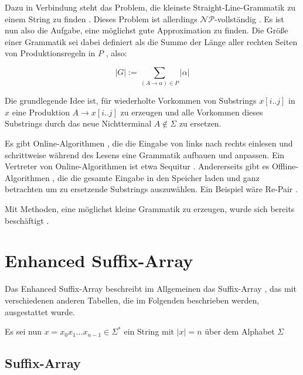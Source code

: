 Dazu in Verbindung steht das Problem, die kleinste Straight-Line-Grammatik zu einem String zu finden \cite{charikar_smallest_2005}. 
Dieses Problem ist allerdings $\mathcal{NP}$-vollständig \cite{charikar_smallest_2005}. Es ist nun also die Aufgabe, eine möglichst gute Approximation zu finden.
Die Größe einer Grammatik sei dabei definiert als die Summe der Länge aller rechten Seiten von Produktionsregeln in $P$ \cite{charikar_smallest_2005}, also:

\begin{equation*}
	|G| := \sum_{(A \rightarrow \alpha) \in P} |\alpha|
\end{equation*}

Die grundlegende Idee ist, für wiederholte Vorkommen von Substrings $x[i..j]$ in $x$ eine Produktion $A \rightarrow x[i..j]$ zu erzeugen und alle Vorkommen dieses Substrings durch das neue Nichtterminal $A \notin \Sigma$ zu ersetzen.

Es gibt Online-Algorithmen \cite{dinklage_compression_2017}, die die Eingabe von links nach rechts einlesen und schrittweise während des Lesens eine Grammatik aufbauen und anpassen. Ein Vertreter von Online-Algorithmen ist etwa Sequitur \cite{nevill-manning_identifying_1997}. 
Andererseits gibt es Offline-Algorithmen \cite{dinklage_compression_2017}, die die gesamte Eingabe in den Speicher laden und ganz betrachten um zu ersetzende Substrings auszuwählen. Ein Beispiel wäre Re-Pair \cite{larsson_offline_1999}.

Mit Methoden, eine möglichst kleine Grammatik zu erzeugen, wurde sich bereits beschäftigt \cite{benz_effective_2013, carrascosa_choosing_2010, charikar_smallest_2005}. 

\section{Enhanced Suffix-Array}

Das Enhanced Suffix-Array \cite{abouelhoda_replacing_2004} beschreibt im Allgemeinen das Suffix-Array \cite{manber_suffix_1993}, das mit verschiedenen anderen Tabellen, die im Folgenden beschrieben werden, ausgestattet wurde.

Es sei nun $x = x_0 x_1 \dots x_{n-1}\in \Sigma^*$ ein String mit $|x| = n$ über dem Alphabet $\Sigma$ 

\subsection{Suffix-Array}


